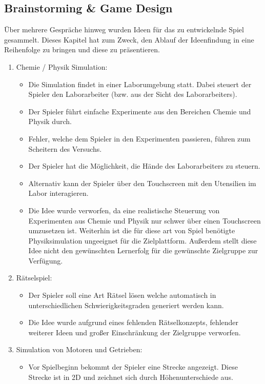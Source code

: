 \subsection{Brainstorming \& Game Design}\label{ssec:idee}
	Über mehrere Gespräche hinweg wurden Ideen für das zu entwickelnde Spiel gesammelt. Dieses Kapitel hat zum Zweck, den Ablauf der Ideenfindung in eine Reihenfolge zu bringen und diese zu präsentieren.
	\begin{enumerate}
		\item{Chemie / Physik Simulation:}
		\begin{itemize}
			\item{Die Simulation findet in einer Laborumgebung statt. Dabei steuert der Spieler den Laborarbeiter (bzw. aus der Sicht des Laborarbeiters).}
			\item{Der Spieler führt einfache Experimente aus den Bereichen Chemie und Physik durch.}
			\item{Fehler, welche dem Spieler in den Experimenten passieren, führen zum Scheitern des Versuchs.}
			\item{Der Spieler hat die Möglichkeit, die Hände des Laborarbeiters zu steuern.}
			\item{Alternativ kann der Spieler über den Touchscreen mit den Utensilien im Labor interagieren.}
			\item{Die Idee wurde verworfen, da eine realistische Steuerung von Experimenten aus Chemie und Physik nur schwer über einen Touchscreen umzusetzen ist. Weiterhin ist die für diese art von Spiel benötigte Physiksimulation ungeeignet für die Zielplattform. Außerdem stellt diese Idee nicht den gewünschten Lernerfolg für die gewünschte Zielgruppe zur Verfügung. }
		\end{itemize}
		\item{Rätselspiel:}
		\begin{itemize}
			\item{Der Spieler soll eine Art Rätsel lösen welche automatisch in unterschiedlichen Schwierigkeitsgraden generiert werden kann.}
			\item{Die Idee wurde aufgrund eines fehlenden Rätselkonzepts, fehlender weiterer Ideen und großer Einschränkung der Zielgruppe verworfen.}
		\end{itemize}
		\item{Simulation von Motoren und Getrieben:}
		\begin{itemize}
			\item{Vor Spielbeginn bekommt der Spieler eine Strecke angezeigt. Diese Strecke ist in 2D und zeichnet sich durch Höhenunterschiede aus.}

\end{itemize}
\end{enumerate}
